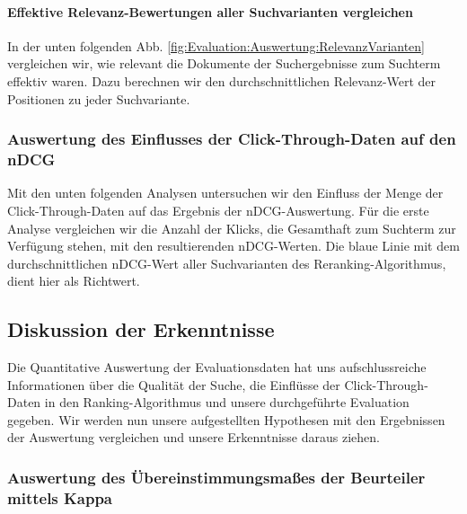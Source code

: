 

\paragraph{Effektive Relevanz-Bewertungen aller Suchvarianten vergleichen}
In der unten folgenden Abb. \ref{fig:Evaluation:Auswertung:RelevanzVarianten} vergleichen wir, wie relevant die Dokumente der Suchergebnisse zum Suchterm effektiv waren. Dazu berechnen wir den durchschnittlichen Relevanz-Wert der Positionen zu jeder Suchvariante.



\subsubsection{Auswertung des Einflusses der Click-Through-Daten auf den nDCG}
\label{sec:Evaluation:Auswertung:QuantitativeAuswertung:EinflussNDCG}

Mit den unten folgenden Analysen untersuchen wir den Einfluss der Menge der Click-Through-Daten auf das Ergebnis der nDCG-Auswertung. Für die erste Analyse vergleichen wir die Anzahl der Klicks, die Gesamthaft zum Suchterm zur Verfügung stehen, mit den resultierenden nDCG-Werten. Die blaue Linie mit dem durchschnittlichen nDCG-Wert aller Suchvarianten des Reranking-Algorithmus, dient hier als Richtwert.




\subsection{Diskussion der Erkenntnisse}
\label{sec:Evaluation:Auswertung:Diskussion}

Die Quantitative Auswertung der Evaluationsdaten hat uns aufschlussreiche Informationen über die Qualität der Suche, die Einflüsse der Click-Through-Daten in den Ranking-Algorithmus und unsere durchgeführte Evaluation gegeben. Wir werden nun unsere aufgestellten Hypothesen mit den Ergebnissen der Auswertung vergleichen und unsere Erkenntnisse daraus ziehen.

\subsubsection{Auswertung des Übereinstimmungsmaßes der Beurteiler mittels Kappa}
\label{sec:Evaluation:Auswertung:Diskussion:Kappa}


